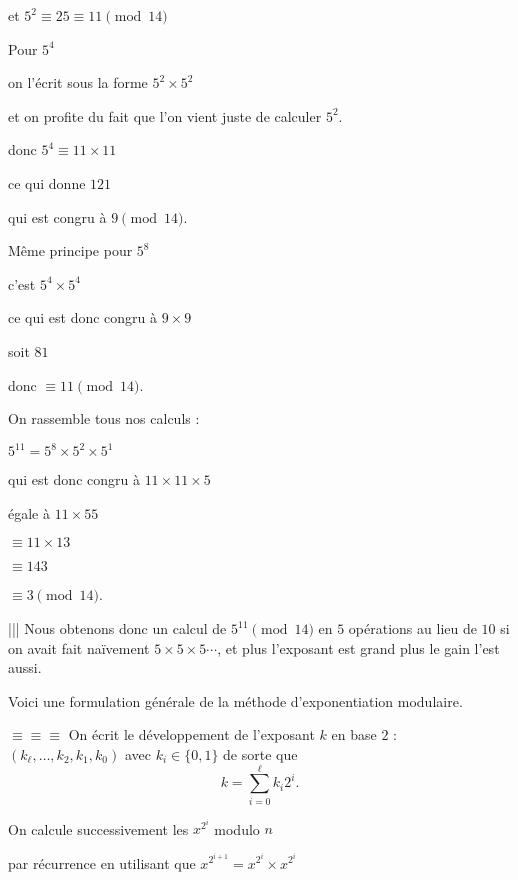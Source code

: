 \change
et
$5^2  \equiv  25 \equiv 11 \pmod{14}$

\change
Pour $5^4$ 

\change
on l'écrit sous la forme $5^2 \times 5^2$

et on profite du fait que l'on vient juste de calculer $5^2$.

\change
donc $5^4 \equiv 11 \times 11$

\change
ce qui donne $121$

\change 
qui est congru à $9 \pmod{14}$.

\change
Même principe pour $5^8$

\change
c'est $5^4 \times 5^4$

\change

ce qui est donc congru à $9 \times 9$

\change

soit $81$

\change

donc $\equiv 11 \pmod{14}$.

\change

On rassemble tous nos calculs :

$5^{11} = 5^8 \times 5^2 \times 5^1$


\change

qui est donc congru à $11 \times 11 \times 5$

\change

égale à $11 \times 55$

\change
$\equiv 11 \times 13$

\change
$\equiv 143$

\change
$\equiv 3 \pmod{14}$.


||| 
Nous obtenons donc un calcul de $5^{11} \pmod{14}$ en $5$ opérations au lieu de $10$ 
si on avait fait naïvement $5\times 5 \times 5 \cdots$, et plus l'exposant est 
grand plus le gain l'est aussi.



\diapo

Voici une formulation générale de la méthode d'exponentiation modulaire.

$\equiv \equiv \equiv $
On écrit le développement de l'exposant $k$ en base $2$ :
$(k_\ell, \ldots, k_2, k_1, k_0)$ avec $k_i \in \{0,1\}$ de sorte que 
$$k = \sum_{i=0}^\ell k_i 2^i.$$


\change
On calcule successivement les $x^{2^i}$ modulo $n$ 

par récurrence en utilisant que $x^{2^{i+1}} = x^{2^i} \times x^{2^i}$

